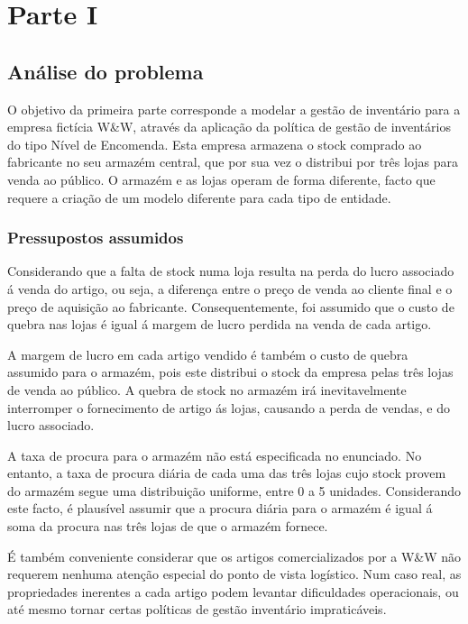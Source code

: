 \chapter{Parte I}

\section{Análise do problema}

O objetivo da primeira parte corresponde a modelar a gestão de inventário para a empresa fictícia W\&W, através da aplicação da política de gestão de inventários do tipo Nível de Encomenda. Esta empresa armazena o stock comprado ao fabricante no seu armazém central, que por sua vez o distribui por três lojas para venda ao público. O armazém e as lojas operam de forma diferente, facto que requere a criação de um modelo diferente para cada tipo de entidade.

\subsection{Pressupostos assumidos} 

Considerando que a falta de stock numa loja resulta na perda do lucro associado á venda do artigo, ou seja, a diferença entre o preço de venda ao cliente final e o preço de aquisição ao fabricante. Consequentemente, foi assumido que o custo de quebra nas lojas é igual á margem de lucro perdida na venda de cada artigo.

A margem de lucro em cada artigo vendido é também o custo de quebra assumido para o armazém, pois este distribui o stock da empresa pelas três lojas de venda ao público. A quebra de stock no armazém irá inevitavelmente interromper o fornecimento de artigo ás lojas, causando a perda de vendas, e do lucro associado. 

A taxa de procura para o armazém não está especificada no enunciado. No entanto, a taxa de procura diária de cada uma das três lojas cujo stock provem do armazém segue uma distribuição uniforme, entre 0 a 5 unidades. Considerando este facto, é plausível assumir que a procura diária para o armazém é igual á soma da procura nas três lojas de que o armazém fornece.  

É também conveniente considerar que os artigos comercializados por a W\&W não requerem nenhuma atenção especial do ponto de vista logístico. Num caso real, as propriedades inerentes a cada artigo podem levantar dificuldades operacionais, ou até mesmo tornar certas políticas de gestão inventário impraticáveis. 

